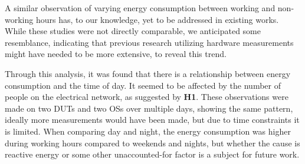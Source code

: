 A similar observation of varying energy consumption between working and non-working hours has, to our knowledge, yet to be addressed in existing works\cite{georgiou2020energy,Koedijk2022diff, khan2018rapl}. While these studies were not directly comparable, we anticipated some resemblance, indicating that previous research utilizing hardware measurements might have needed to be more extensive, to reveal this trend.

Through this analysis, it was found that there is a relationship between energy consumption and the time of day. It seemed to be affected by the number of people on the electrical network, as suggested by \textbf{H1}. These observations were made on two DUTs and two OSs over multiple days, showing the same pattern, ideally more measurements would have been made, but due to time constraints it is limited. When comparing day and night, the energy consumption was higher during working hours compared to weekends and nights, but whether the cause is reactive energy or some other unaccounted-for factor is a subject for future work.









